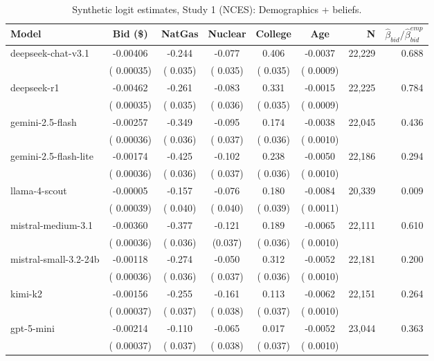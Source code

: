 \begin{table}[h]
\centering
\caption{Synthetic logit estimates, Study 1 (NCES): Demographics + beliefs.}
\label{tab:syn-logit-withBeliefs}
\begin{threeparttable}
\footnotesize
\begin{tabular}{lcccccrr}
\toprule
Model & Bid (\$) & NatGas & Nuclear & College & Age & N & $\hat\beta_{bid}/\hat\beta_{bid}^{emp}$ \\
\midrule
deepseek-chat-v3.1 &  -0.00406 &  -0.244 &  -0.077 &   0.406 & -0.0037 &    22,229 &  0.688 \\
 & (  0.00035) & (  0.035) & (  0.035) & (  0.035) & ( 0.0009) & & \\
deepseek-r1 &  -0.00462 &  -0.261 &  -0.083 &   0.331 & -0.0015 &    22,225 &  0.784 \\
 & (  0.00035) & (  0.035) & (  0.036) & (  0.035) & ( 0.0009) & & \\
gemini-2.5-flash &  -0.00257 &  -0.349 &  -0.095 &   0.174 & -0.0038 &    22,045 &  0.436 \\
 & (  0.00036) & (  0.036) & (  0.037) & (  0.036) & ( 0.0010) & & \\
gemini-2.5-flash-lite &  -0.00174 &  -0.425 &  -0.102 &   0.238 & -0.0050 &    22,186 &  0.294 \\
 & (  0.00036) & (  0.036) & (  0.037) & (  0.036) & ( 0.0010) & & \\
llama-4-scout &  -0.00005 &  -0.157 &  -0.076 &   0.180 & -0.0084 &    20,339 &  0.009 \\
 & (  0.00039) & (  0.040) & (  0.040) & (  0.039) & ( 0.0011) & & \\
mistral-medium-3.1 &  -0.00360 &  -0.377 &  -0.121 &   0.189 & -0.0065 &    22,111 &  0.610 \\
 & (  0.00036) & (  0.036) & (0.037) & (  0.036) & ( 0.0010) & & \\
mistral-small-3.2-24b &  -0.00118 &  -0.274 &  -0.050 &   0.312 & -0.0052 &    22,181 &  0.200 \\
 & (  0.00036) & (  0.036) & (  0.037) & (  0.036) & ( 0.0010) & & \\
kimi-k2 &  -0.00156 &  -0.255 &  -0.161 &   0.113 & -0.0062 &    22,151 &  0.264 \\
 & (  0.00037) & (  0.037) & (  0.038) & (  0.037) & ( 0.0010) & & \\
gpt-5-mini &  -0.00214 &  -0.110 &  -0.065 &   0.017 & -0.0052 &    23,044 &  0.363 \\
 & (  0.00037) & (  0.037) & (  0.038) & (  0.037) & ( 0.0010) & & \\

\end{tabular}
\end{threeparttable}
\end{table}
